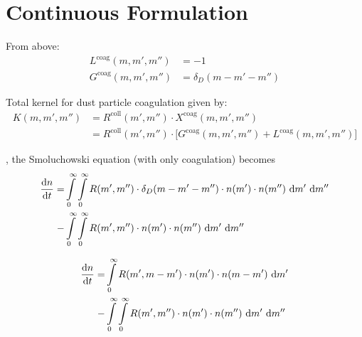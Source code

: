 \section{Continuous Formulation}

    

    From above:
    \begin{align}
        L^\text{coag}(m,m',m'') &= -1 \\
        G^\text{coag}(m,m',m'') &= \delta_D(m-m'-m'')
    \end{align}

    Total kernel for dust particle coagulation given by:
    \begin{align}
        K(m,m',m'')
        &= R^\text{coll}(m',m'') \cdot X^\text{coag}(m,m',m'') \\
        &= R^\text{coll}(m',m'') \cdot \bigg[G^\text{coag}(m,m',m'') + L^\text{coag}(m,m',m'')\bigg]
    \end{align}

    , the
    Smoluchowski equation (with only coagulation) becomes
    \begin{align}
        \frac{\text{d} n}{\text{d} t}
        = 
            &\int\limits_0^\infty \int\limits_0^\infty R(m',m'') \cdot \delta_D(m-m'-m'')
            \cdot n(m') \cdot n(m'') \ \text dm' \ \text dm'' \\
            -&\int\limits_0^\infty \int\limits_0^\infty R(m',m'')
            \cdot n(m') \cdot n(m'') \ \text dm' \ \text dm'' 
    \end{align}

    \begin{align}
        \frac{\text{d} n}{\text{d} t}
        = 
            &\int\limits_0^\infty R(m',m-m') \cdot n(m') \cdot n(m-m') \ \text dm' \\
            -&\int\limits_0^\infty \int\limits_0^\infty R(m',m'')
            \cdot n(m') \cdot n(m'') \ \text dm' \ \text dm'' 
    \end{align}

